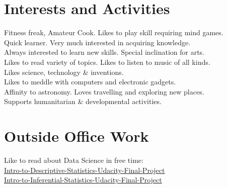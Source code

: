 \documentclass[a4paper,10pt]{article} %
\begin{document}
\section{Interests and Activities}
Fitness freak, Amateur Cook. Likes to play skill requiring mind games.\\
Quick learner. Very much interested in acquiring knowledge.\\
Always interested to learn new skills. Special inclination for arts.\\
Likes to read variety of topics. Likes to listen to music of all kinds.\\
Likes science, technology \& inventions.\\
Likes to meddle with computers and electronic gadgets.\\
Affinity to astronomy. Loves travelling and exploring new places.\\
Supports humanitarian \& developmental activities.

\section{Outside Office Work}
Like to read about Data Science in free time:\\
\href{https://docs.google.com/spreadsheets/d/119tlJCNgTcg1RGLWL1T5nZH0Lj7HAtEktJBymnpFkQA/edit?usp=sharing}{Intro-to-Descriptive-Statistics-Udacity-Final-Project}\\
\href{https://docs.google.com/spreadsheets/d/1fLTxtzmr2lL2DZbYCNN3SOrq32Kvs1yG5MDb5RsWkL0/edit?usp=sharing}{Intro-to-Inferential-Statistics-Udacity-Final-Project}

\end{document}
